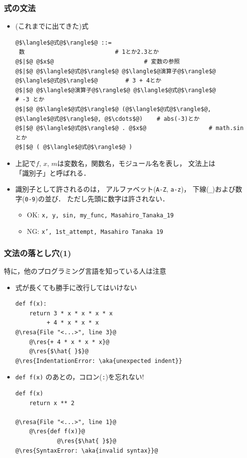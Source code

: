 \documentclass[10pt,dvipdfmx]{beamer}
\newcommand{\ore}[1]{{\color{orange}#1}}
\newcommand{\ao}[1]{{\color{blue}#1}}
\newcommand{\aka}[1]{{\color{red}#1}}
\newcommand{\resa}[1]{\ore{\textsl{$\rightarrow$ #1}}}
\newcommand{\res}[1]{\ore{\textsl{#1}}}
\begin{document}
\begin{frame}[fragile]
\frametitle{式の文法}
\begin{itemize}
\item (これまでに出てきた)式
\begin{lstlisting}
@$\langle$@式@$\rangle$@ ::=
 数                          # 1とか2.3とか
@$|$@ @$x$@                          # 変数の参照
@$|$@ @$\langle$@式@$\rangle$@ @$\langle$@演算子@$\rangle$@ @$\langle$@式@$\rangle$@        # 3 + 4とか
@$|$@ @$\langle$@演算子@$\rangle$@ @$\langle$@式@$\rangle$@             # -3 とか
@$|$@ @$\langle$@式@$\rangle$@ (@$\langle$@式@$\rangle$@, @$\langle$@式@$\rangle$@, @$\cdots$@)    # abs(-3)とか
@$|$@ @$\langle$@式@$\rangle$@ . @$x$@                  # math.sin とか
@$|$@ ( @$\langle$@式@$\rangle$@ )
\end{lstlisting}

\item 上記で$f$, $x$, $m$は変数名，関数名，モジュール名を表し，
文法上は\ao{「識別子」}と呼ばれる．
\item 識別子として許されるのは，
アルファベット(\ao{\tt A-Z}, \ao{\tt a-z})，
下線(\ao{\tt \_})および数字(\ao{\tt 0-9})の並び．
ただし先頭に数字は許されない．
\begin{itemize}
\item OK: {\tt x, y, sin, my\_func, Masahiro\_Tanaka\_19}
\item NG: {\tt x', 1st\_attempt, Masahiro Tanaka 19}
\end{itemize}
\end{itemize}
\end{frame}

\begin{frame}[fragile]
\frametitle{文法の落とし穴(1)}
特に，他のプログラミング言語を知っている人は注意

\begin{itemize}
\item 式が長くても\aka{勝手に改行してはいけない}
\begin{lstlisting}
def f(x):
    return 3 * x * x * x * x
         + 4 * x * x * x
@\resa{File "<...>", line 3}@
    @\res{+ 4 * x * x * x}@
    @\res{$\hat{ }$}@
@\res{IndentationError: \aka{unexpected indent}}
\end{lstlisting}

\item {\tt def f(x)} のあとの，\aka{コロン({\tt :})を忘れない!}
\begin{lstlisting}
def f(x)
    return x ** 2

@\resa{File "<...>", line 1}@
    @\res{def f(x)}@
            @\res{$\hat{ }$}@
@\res{SyntaxError: \aka{invalid syntax}}@
\end{lstlisting}
\end{itemize}
\end{frame}
\end{document}
